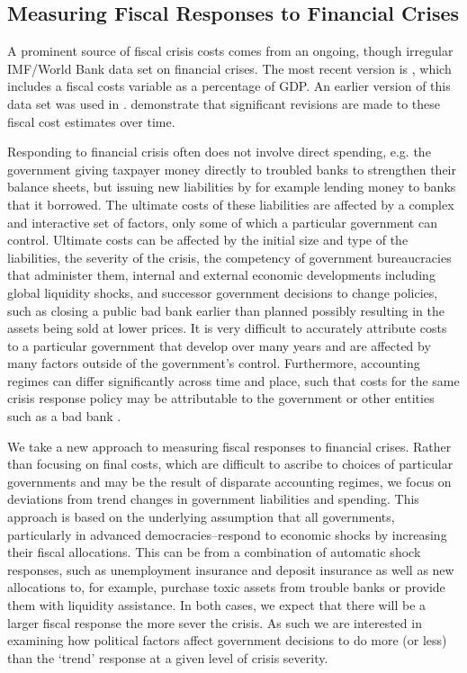 \documentclass[]{article}
\begin{document}
\subsection*{Measuring Fiscal Responses to Financial Crises}

A prominent source of fiscal crisis costs comes from an ongoing, though irregular IMF/World Bank data set on financial crises. The most recent version is \cite{laeven2013}, which includes a fiscal costs variable as a percentage of GDP. An earlier version of this data set was used in \cite{Keefer2007}. \cite{GandrudHallerberg2015} demonstrate that significant revisions are made to these fiscal cost estimates over time.

Responding to financial crisis often does not involve direct spending, e.g. the government giving taxpayer money directly to troubled banks to strengthen their balance sheets, but issuing new liabilities by for example lending money to banks that it borrowed. The ultimate costs of these liabilities are affected by a complex and interactive set of factors, only some of which a particular government can control. Ultimate costs can be affected by the initial size and type of the liabilities, the severity of the crisis, the competency of government bureaucracies that administer them, internal and external economic developments including global liquidity shocks, and successor government decisions to change policies, such as closing a public bad bank earlier than planned possibly resulting in the assets being sold at lower prices. It is very difficult to accurately attribute costs to a particular government that develop over many years and are affected by many factors outside of the government's control. Furthermore, accounting regimes can differ significantly across time and place, such that costs for the same crisis response policy may be attributable to the government or other entities such as a bad bank \citep{gandrudHallerbergWEP}.

We take a new approach to measuring fiscal responses to financial crises. Rather than focusing on final costs, which are difficult to ascribe to choices of particular governments and may be the result of disparate accounting regimes, we focus on deviations from trend changes in government liabilities and spending. This approach is based on the underlying assumption that all governments, particularly in advanced democracies--respond to economic shocks by increasing their fiscal allocations. This can be from a combination of automatic shock responses, such as unemployment insurance and deposit insurance as well as new allocations to, for example, purchase toxic assets from trouble banks or provide them with liquidity assistance. In both cases, we expect that there will be a larger fiscal response the more sever the crisis. As such we are interested in examining how political factors affect government decisions to do more (or less) than the `trend' response at a given level of crisis severity.
\end{document}
